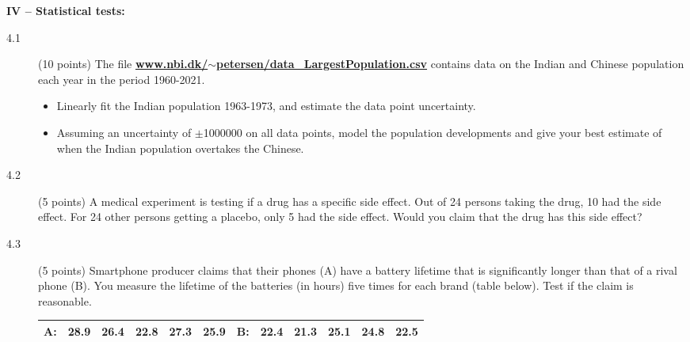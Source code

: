 \documentclass[11pt]{article}
\begin{document}
\noindent
{\bf IV -- Statistical tests:}
\vspace*{-1ex}
\begin{description}
\item[4.1] (10 points)
  The file \href{http://www.nbi.dk/~petersen/data\_LargestPopulation.csv}{\bf www.nbi.dk/$\sim$petersen/data\_LargestPopulation.csv}
  contains data on the Indian and Chinese population each year in the period 1960-2021.
  \vspace*{-1ex}
  \begin{itemize}
    \item Linearly fit the Indian population 1963-1973, and estimate the data point uncertainty.
    \item Assuming an uncertainty of $\pm$1000000 on all data points, model the population developments
      and give your best estimate of when the Indian population overtakes the Chinese.
  \end{itemize}
%
\item[4.2] (5 points)
  A medical experiment is testing if a drug has a specific side effect. Out of 24 persons taking the drug,
  10 had the side effect. For 24 other persons getting a placebo, only 5 had the side effect. Would you
  claim that the drug has this side effect?
%
\item[4.3] (5 points)
  Smartphone producer claims that their phones (A) have a battery lifetime that is significantly longer than that of a
  rival phone (B). You measure the lifetime of the batteries (in hours) five times for each brand (table below).
  Test if the claim is reasonable.\\[-4ex]
  \begin{center}
  \begin{tabular}{|lccccc|lccccc|}
    \hline
      A:   &28.9  &26.4  &22.8  &27.3  &25.9  &B:   &22.4  &21.3  &25.1  &24.8  &22.5\\
    \hline
  \end{tabular}
  \end{center}

\end{description}


\end{document}
